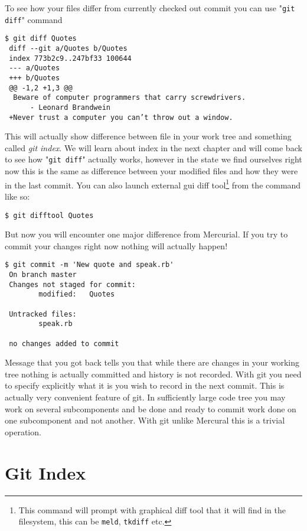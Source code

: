 \documentclass{article}
\theoremstyle{definition}
\begin{document}
        \noindent To see how your files differ from currently checked out commit you can use "\texttt{git diff}" command
    \begin{Verbatim}[frame=single]
 $ git diff Quotes
 diff --git a/Quotes b/Quotes
 index 773b2c9..247bf33 100644
 --- a/Quotes
 +++ b/Quotes
 @@ -1,2 +1,3 @@
  Beware of computer programmers that carry screwdrivers.
      - Leonard Brandwein
 +Never trust a computer you can’t throw out a window.
        \end{Verbatim}
        This will actually show difference between file in your work tree and something called {\em git index}. We will
        learn about index in the next chapter and will come back to see how "\texttt{git diff}" actually works, however in
        the state we find ourselves right now this is the same as difference between your modified files and how they
        were in the last commit. You can also launch external gui diff tool\footnote{This command will prompt with
          graphical diff tool that it will find in the filesystem, this can be \texttt{meld}, \texttt{tkdiff} etc.} from
        the command like so:

        \begin{Verbatim}[frame=single]
 $ git difftool Quotes
        \end{Verbatim}
        But now you will encounter one major difference from Mercurial. If you try to commit your changes right now
        nothing will actually happen!

    \begin{Verbatim}[frame=single]
 $ git commit -m 'New quote and speak.rb'
 On branch master
 Changes not staged for commit:
        modified:   Quotes

 Untracked files:
        speak.rb

 no changes added to commit
        \end{Verbatim}
        Message that you got back tells you that while there are changes in your working tree nothing is actually
        committed and history is not recorded. With git you need to specify explicitly what it is you wish to record
        in the next commit. This is actually very convenient feature of git. In sufficiently large code tree you may
        work on several subcomponents and be done and ready to commit work done on one subcomponent and not another.
        With git unlike Mercural this is a trivial operation.

        \section{Git Index}
\end{document}
